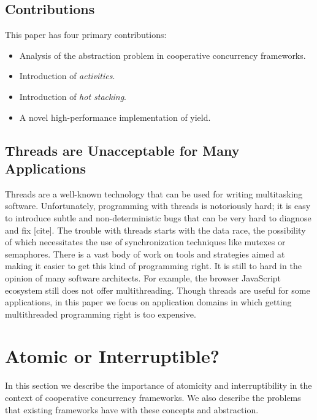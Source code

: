 \documentclass[9pt,preprint]{sigplanconf}
\begin{document}
\subsection{Contributions}

This paper has four primary contributions:

\begin{itemize}
\item Analysis of the abstraction problem in cooperative concurrency frameworks.
\item Introduction of \emph{activities}.
\item Introduction of \emph{hot stacking}.
\item A novel high-performance implementation of yield.
\end{itemize}


\subsection{Threads are Unacceptable for Many Applications}

Threads are a well-known technology that can be used for writing multitasking software\footnotemark{}.
Unfortunately, programming with threads is notoriously hard; it is easy to introduce subtle and non-deterministic bugs that can be very hard to diagnose and fix [cite].
The trouble with threads starts with the data race, the possibility of which necessitates the use of synchronization techniques like mutexes or semaphores.
There is a vast body of work on tools and strategies aimed at making it easier to get this kind of programming right.
It is still to hard in the opinion of many software architects.
For example, the browser JavaScript ecosystem still does not offer multithreading.
Though threads are useful for some applications, in this paper we focus on application domains in which getting multithreaded programming right is too expensive.


\section{Atomic or Interruptible?}

In this section we describe the importance of atomicity and interruptibility in the context of cooperative concurrency frameworks.
We also describe the problems that existing frameworks have with these concepts and abstraction.
\end{document}
